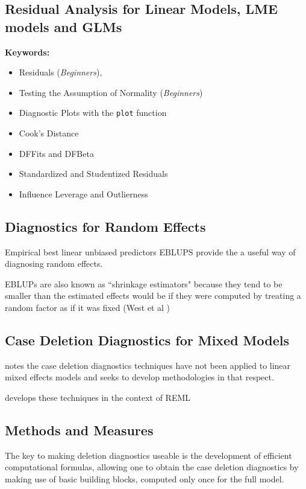 \documentclass[12pt, a4paper]{article}
\begin{document}
\subsection{Residual Analysis for Linear Models, LME models and GLMs}

\textbf{Keywords:}

\begin{itemize}
	\item Residuals (\emph{Beginners}), 
	\item Testing the Assumption of Normality (\emph{Beginners})
	\item Diagnostic Plots with the \texttt{plot} function
	\item Cook's Distance
	\item DFFits and DFBeta
	\item Standardized and Studentized Residuals
	\item Influence Leverage and Outlierness
\end{itemize}


\subsection{Diagnostics for Random Effects}
Empirical best linear unbiased predictors EBLUPS provide the a useful way of diagnosing random effects.

EBLUPs are also known as ``shrinkage estimators" because they tend to be smaller than the estimated effects would be if they were computed by treating a random factor as if it was fixed (West et al )







\subsection{Case Deletion Diagnostics for Mixed Models}

\citet{Christensen} notes the case deletion diagnostics techniques have not been applied to linear mixed effects models and seeks to develop methodologies in that respect.

\citet{Christensen} develops these techniques in the context of REML

\subsection{Methods and Measures}
The key to making deletion diagnostics useable is the development of efficient computational formulas, allowing one to obtain the  case deletion diagnostics by making use of basic building blocks, computed only once for the full model.
\end{document}
